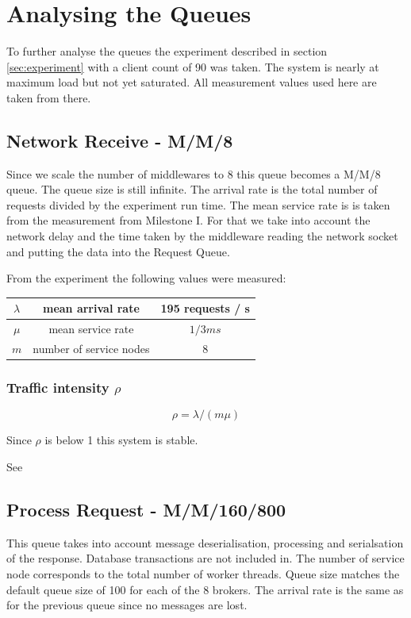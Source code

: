 \documentclass[a4paper]{article}
\begin{document}
\section{Analysing the Queues}

To further analyse the queues the experiment described in section \ref{sec:experiment} with a client count of 90 was taken. The system is nearly at maximum load but not yet saturated. All measurement values used here are taken from there.

\subsection{Network Receive - M/M/8}
\label{sub:QueueNwReceive}

Since we scale the number of middlewares to 8 this queue becomes a M/M/8 queue. The queue size is still infinite. The arrival rate is the total number of requests divided by the experiment run time. The mean service rate is is taken from the measurement from Milestone I. For that we take into account the network delay and the time taken by the middleware reading the network socket and putting the data into the Request Queue.


From the experiment the following values were measured:\\

\begin{tabular}{|c|c|c|}
\hline 
$\lambda$ & mean arrival rate & 195 requests / s \\ 
\hline 
$\mu$ & mean service rate & ${1 / {3ms}}$\\ 
\hline 
$m$ & number of service nodes & 8 \\ 
\hline 
\end{tabular} 

\subsubsection{Traffic intensity $\rho$}
\begin{equation}
\label{eq:TraficIntensity}
\rho = \lambda / (m \mu)
\end{equation}


Since $\rho$ is below 1 this system is stable.


See \cite[Box 31.2]{Raj}

\subsection{Process Request - M/M/160/800}
This queue takes into account message deserialisation, processing and serialsation of the response. Database transactions are not included in. The number of service node corresponds to the total number of worker threads. Queue size matches the default queue size of 100 for each of the 8 brokers. The arrival rate is the same as for the previous queue since no messages are lost.\\
\end{document}

